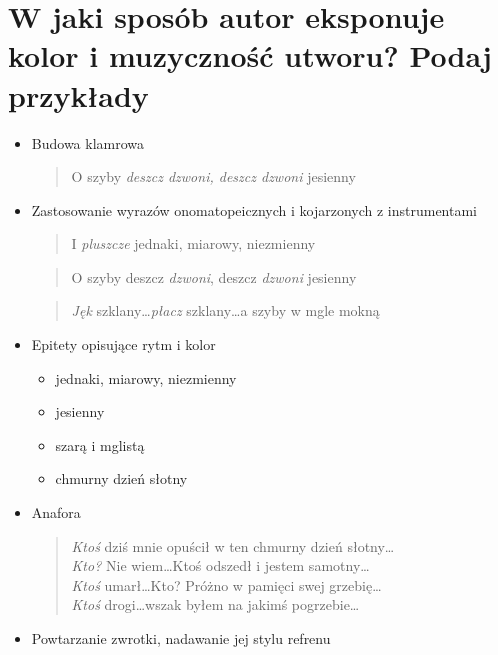 \documentclass[a4paper]{article}
\begin{document}
\section{W jaki sposób autor eksponuje kolor i muzyczność utworu? Podaj przykłady}
\begin{itemize}
        \item Budowa klamrowa
        \begin{quote}
                O szyby \emph{deszcz dzwoni, deszcz dzwoni} jesienny
        \end{quote}
        \item Zastosowanie wyrazów onomatopeicznych i kojarzonych z instrumentami
        \begin{quote}
                I \emph{pluszcze} jednaki, miarowy, niezmienny
        \end{quote}
        \begin{quote}
                O szyby deszcz \emph{dzwoni}, deszcz \emph{dzwoni} jesienny
        \end{quote}
        \begin{quote}
                \emph{Jęk} szklany\dots \emph{płacz} szklany\dots a szyby w mgle mokną
        \end{quote}
        \item Epitety opisujące rytm i kolor
        \begin{itemize}
                \item jednaki, miarowy, niezmienny
                \item jesienny
                \item szarą i mglistą
                \item chmurny dzień słotny
        \end{itemize}
        \pagebreak
        \item Anafora
        \begin{quote}
                \emph{Ktoś} dziś mnie opuścił w ten chmurny dzień słotny\dots \\
                \emph{Kto?} Nie wiem\dots Ktoś odszedł i jestem samotny\dots \\
                \emph{Ktoś} umarł\dots Kto? Próżno w pamięci swej grzebię\dots \\
                \emph{Ktoś} drogi\dots wszak byłem na jakimś pogrzebie\dots
        \end{quote}
        \item Powtarzanie zwrotki, nadawanie jej stylu refrenu
        \begin{quote}

\end{quote}
\end{itemize}
\end{document}
